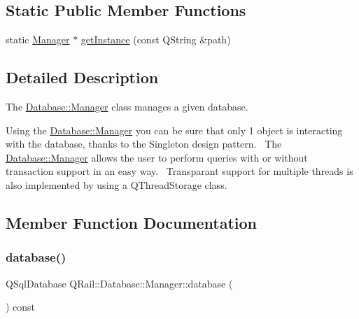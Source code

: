 \subsection*{Static Public Member Functions}
\begin{DoxyCompactItemize}
\item 
static \mbox{\hyperlink{classQRail_1_1Database_1_1Manager}{Manager}} $\ast$ \mbox{\hyperlink{classQRail_1_1Database_1_1Manager_af3059373b4500f85b00ce971c9f32298}{get\+Instance}} (const Q\+String \&path)
\end{DoxyCompactItemize}


\subsection{Detailed Description}
The \mbox{\hyperlink{classQRail_1_1Database_1_1Manager}{Database\+::\+Manager}} class manages a given database. 

Using the \mbox{\hyperlink{classQRail_1_1Database_1_1Manager}{Database\+::\+Manager}} you can be sure that only 1 object is interacting with the database, thanks to the Singleton design pattern.~\newline
 The \mbox{\hyperlink{classQRail_1_1Database_1_1Manager}{Database\+::\+Manager}} allows the user to perform queries with or without transaction support in an easy way.~\newline
 Transparant support for multiple threads is also implemented by using a Q\+Thread\+Storage class.~\newline
 

\subsection{Member Function Documentation}
\mbox{\label{classQRail_1_1Database_1_1Manager_a68d971d9a7e9a6e41d2ab06892711288}} 
\subsubsection{\texorpdfstring{database()}{database()}}
{\footnotesize\ttfamily Q\+Sql\+Database Q\+Rail\+::\+Database\+::\+Manager\+::database (\begin{DoxyParamCaption}{ }\end{DoxyParamCaption}) const}



